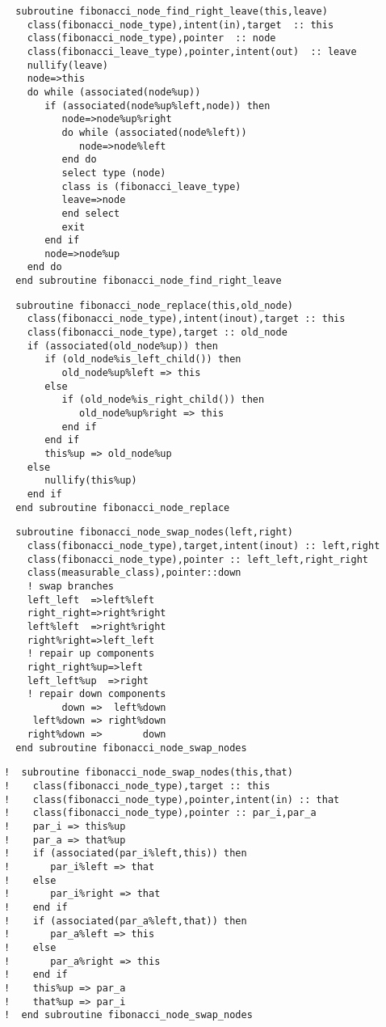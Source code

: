 \begin{Verbatim}
  subroutine fibonacci_node_find_right_leave(this,leave)
    class(fibonacci_node_type),intent(in),target  :: this
    class(fibonacci_node_type),pointer  :: node
    class(fibonacci_leave_type),pointer,intent(out)  :: leave
    nullify(leave)
    node=>this
    do while (associated(node%up))
       if (associated(node%up%left,node)) then
          node=>node%up%right
          do while (associated(node%left))
             node=>node%left
          end do
          select type (node)
          class is (fibonacci_leave_type)
          leave=>node
          end select
          exit
       end if
       node=>node%up
    end do
  end subroutine fibonacci_node_find_right_leave
\end{Verbatim}

\begin{Verbatim}
  subroutine fibonacci_node_replace(this,old_node)
    class(fibonacci_node_type),intent(inout),target :: this
    class(fibonacci_node_type),target :: old_node
    if (associated(old_node%up)) then
       if (old_node%is_left_child()) then
          old_node%up%left => this
       else
          if (old_node%is_right_child()) then
             old_node%up%right => this
          end if
       end if
       this%up => old_node%up
    else
       nullify(this%up)
    end if
  end subroutine fibonacci_node_replace
\end{Verbatim}

\begin{Verbatim}
  subroutine fibonacci_node_swap_nodes(left,right)
    class(fibonacci_node_type),target,intent(inout) :: left,right
    class(fibonacci_node_type),pointer :: left_left,right_right
    class(measurable_class),pointer::down
    ! swap branches
    left_left  =>left%left
    right_right=>right%right
    left%left  =>right%right
    right%right=>left_left
    ! repair up components
    right_right%up=>left
    left_left%up  =>right
    ! repair down components
          down =>  left%down
     left%down => right%down
    right%down =>       down
  end subroutine fibonacci_node_swap_nodes
\end{Verbatim}

\begin{Verbatim}
!  subroutine fibonacci_node_swap_nodes(this,that)
!    class(fibonacci_node_type),target :: this
!    class(fibonacci_node_type),pointer,intent(in) :: that
!    class(fibonacci_node_type),pointer :: par_i,par_a
!    par_i => this%up
!    par_a => that%up
!    if (associated(par_i%left,this)) then
!       par_i%left => that
!    else
!       par_i%right => that
!    end if
!    if (associated(par_a%left,that)) then
!       par_a%left => this
!    else
!       par_a%right => this
!    end if
!    this%up => par_a
!    that%up => par_i
!  end subroutine fibonacci_node_swap_nodes
\end{Verbatim}
  
